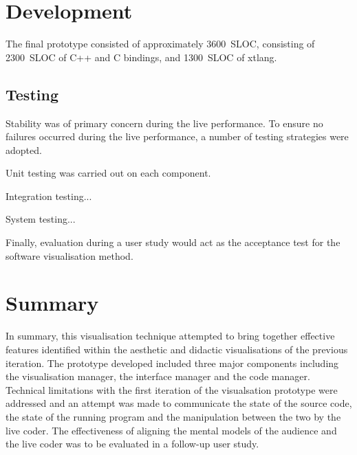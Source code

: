 \section{Development}

The final prototype consisted of approximately 3600~\ac{SLOC}, consisting of 2300~\ac{SLOC} of C++ and C bindings, and 1300~\ac{SLOC} of xtlang.

\subsection{Testing}

Stability was of primary concern during the live performance. To ensure no failures occurred during the live performance, a number of testing strategies were adopted. \more

Unit testing was carried out on each component.

Integration testing... \more

System testing... \more

Finally, evaluation during a user study would act as the acceptance test for the software visualisation method.

\section{Summary}

In summary, this visualisation technique attempted to bring together effective features identified within the aesthetic and didactic visualisations of the previous iteration. The prototype developed included three major components including the visualisation manager, the interface manager and the code manager. Technical limitations with the first iteration of the visualsation prototype were addressed and an attempt was made to communicate the state of the source code, the state of the running program and the manipulation between the two by the live coder. The effectiveness of aligning the mental models of the audience and the live coder was to be evaluated in a follow-up user study.


